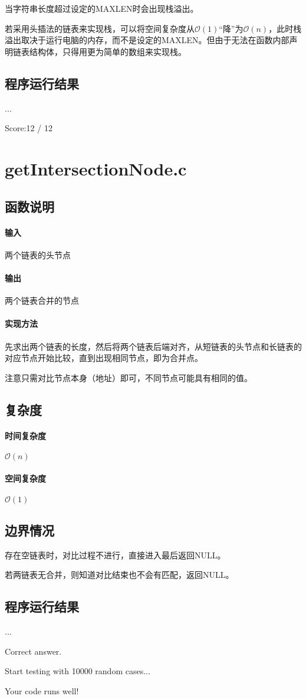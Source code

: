 \documentclass{homework}
\begin{document}
当字符串长度超过设定的MAXLEN时会出现栈溢出。

若采用头插法的链表来实现栈，可以将空间复杂度从$\mathcal{O}(1)$“降”为$\mathcal{O}(n)$，此时栈溢出取决于运行电脑的内存，而不是设定的MAXLEN。但由于无法在函数内部声明链表结构体，只得用更为简单的数组来实现栈。
\subsection{程序运行结果}

...

Score:12 / 12
\section{getIntersectionNode.c}
\subsection{函数说明}
\paragraph{输入}
两个链表的头节点
\paragraph{输出}
两个链表合并的节点
\paragraph{实现方法}

先求出两个链表的长度，然后将两个链表后端对齐，从短链表的头节点和长链表的对应节点开始比较，直到出现相同节点，即为合并点。

注意只需对比节点本身（地址）即可，不同节点可能具有相同的值。
\subsection{复杂度}
\paragraph{时间复杂度}
$\mathcal{O}(n)$
\paragraph{空间复杂度}
$\mathcal{O}(1)$
\subsection{边界情况}

存在空链表时，对比过程不进行，直接进入最后返回NULL。

若两链表无合并，则知道对比结束也不会有匹配，返回NULL。
\subsection{程序运行结果}

...

Correct answer.

Start testing with 10000 random cases...

Your code runs well!
\end{document}
